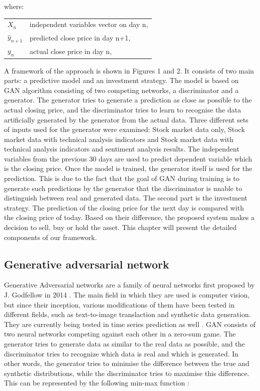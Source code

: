 \documentclass[11pt]{article} %
\makeatletter
\newenvironment{conditions}
  {\par\vspace{\abovedisplayskip}\noindent\begin{tabular}{>{$}l<{$} @{${}={}$} l}}
  {\end{tabular}\par\vspace{\belowdisplayskip}}
\makeatother
\begin{document}
where:
\begin{conditions}
X_n & independent variables vector on day n, \\ 
 \hat{y}_{n+1}     &   predicted close price in day n+1,\\
 y_{n}     &  actual close price  in day n,\\   
\end{conditions}

A framework of the approach is shown in Figures 1 and 2. It consists of two main parts: a predictive model and an investment strategy. The model is based on GAN algorithm consisting of two competing networks, a discriminator and a generator. The generator tries to generate a prediction as close as possible to the actual closing price, and the discriminator tries to learn to recognise the data artificially generated by the generator from the actual data. Three different sets of inputs used for the generator were examined: Stock market data only, Stock market data with technical analysis indicators and Stock market data with technical analysis indicators and sentiment analysis results. The independent variables from the previous 30 days are used to predict dependent variable which is the closing price. Once the model is trained, the generator itself is used for the prediction. This is due to the fact that the goal of GAN during training is to generate such predictions by the generator that the discriminator is unable to distinguish between real and generated data. The second part is the investment strategy. The prediction of the closing price for the next day is compared with the closing price of today. Based on their difference, the proposed system makes a decision to sell, buy or hold the asset. This chapter will present the detailed components of our framework. 

\subsection{Generative adversarial network}

Generative Adversarial networks are a family of neural networks first proposed by J. Godfellow in 2014 \cite{gan1}. The main field in which they are used is computer vision, but since their inception, various modifications of them have been tested in different fields, such as text-to-image translaction and synthetic data generation. They are currently being tested in time series prediction as well \cite{gan-zhang}.  GAN consists of two neural networks competing against each other in a zero-sum game. The generator tries to generate data as similar to the real data as possible, and the discriminator tries to recognize which data is real and which is generated. In other words, the generator tries to minimise the difference between the true and synthetic distributions, while the discriminator tries to maximise this difference. This can be represented by the following min-max function \cite{s-gan}: 
\end{document}
